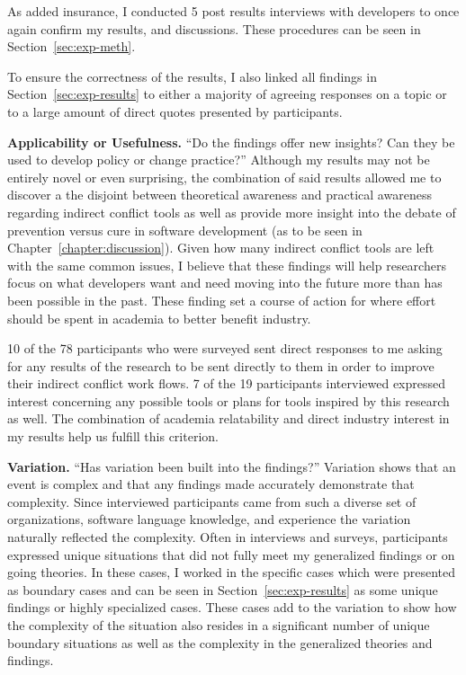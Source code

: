 As added insurance, I conducted 5 post results interviews with developers to once again confirm my results, and discussions. These
procedures can be seen in Section~\ref{sec:exp-meth}.

To ensure the correctness of the results, I also linked all findings in Section~\ref{sec:exp-results} to either a majority of agreeing
responses on a topic or to a large amount of direct quotes presented by participants.

{\bfseries Applicability or Usefulness.} ``Do the findings offer new insights? Can they be used to develop policy or change practice?''
Although my results may not be entirely novel or even surprising, the combination of said results allowed me to discover a
the disjoint between theoretical awareness and practical awareness regarding indirect conflict tools as well as provide more
insight into the debate of prevention versus cure in software development (as to be seen in Chapter~\ref{chapter:discussion}). 
Given how many indirect conflict tools are left with the same common
issues, I believe that these findings will help researchers focus on what developers want and need moving into the future more than has
been possible in the past. These finding set a course of action for where effort should be spent in academia to better benefit industry.

10 of the 78 participants who were surveyed sent direct responses to me asking for any results of the research to be sent directly to
them in order to improve their indirect conflict work flows. 7 of the 19 participants interviewed expressed interest concerning any possible
tools or plans for tools inspired by this research as well. The combination of academia relatability and direct industry interest 
in my results help us fulfill this criterion.

{\bfseries Variation.} ``Has variation been built into the findings?'' Variation shows that an event is complex and that any findings
made accurately demonstrate that complexity. Since interviewed participants came from such a diverse set of organizations, 
software language knowledge, and experience the variation naturally reflected the complexity. Often in interviews and surveys, participants
expressed unique situations that did not fully meet my generalized findings or on going theories. In these cases, I worked in the specific
cases which were presented as boundary cases and can be seen in Section~\ref{sec:exp-results} as some unique findings or highly
specialized cases. These cases add to the variation
to show how the complexity of the situation also resides in a significant number of unique boundary situations as well as the complexity
in the generalized theories and findings.

